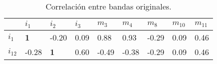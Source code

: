 \begin{table}[ht!]
\begin{center}
\begin{tabular}{| p{1cm} | p{1cm} | p{1cm} | p{1cm} | p{1cm} | p{1cm} | p{1cm} | p{1cm} | p{1cm} |}
\hline
  & $i_{1}$ & $i_{2}$ & $i_{3}$ & $m_{3}$ & $m_{4}$ & $m_{8}$ & $m_{10}$ & $m_{11}$ \\
\hline
$i_{1}$ & \bf{1} & -0.20 & 0.09 & 0.88 & 0.93 & -0.29 & 0.09 & 0.46\\
\hline
$i_{12}$ & -0.28 & \bf{1} & 0.60 & -0.49 & -0.38 & -0.29 & 0.09 & 0.46\\
\hline
\end{tabular}
\end{center} 	
\caption{Correlación entre bandas originales.} \label{oirgcorr}
\end{table}
